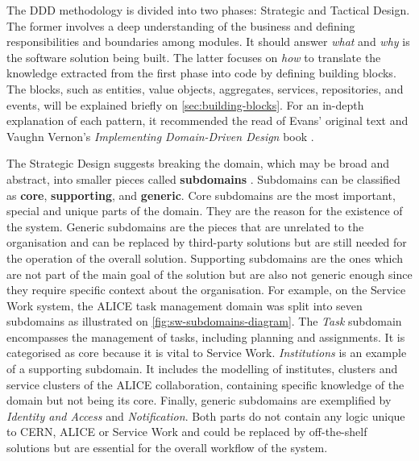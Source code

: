 The DDD methodology is divided into two phases: Strategic and Tactical Design. The former involves a deep understanding of the business and defining responsibilities and boundaries among modules. It should answer \textit{what} and \textit{why} is the software solution being built. The latter focuses on \textit{how} to translate the knowledge extracted from the first phase into code by defining building blocks. The blocks, such as entities, value objects, aggregates, services, repositories, and events, will be explained briefly on \autoref{sec:building-blocks}. For an in-depth explanation of each pattern, it recommended the read of Evans' original text \cite{ddd-blue-book} and Vaughn Vernon's \textit{Implementing Domain-Driven Design} book \cite{ddd-red-book}.

The Strategic Design suggests breaking the domain, which may be broad and abstract, into smaller pieces called \textbf{subdomains} \cite{petter-holmstrom-part1}. Subdomains can be classified as \textbf{core}, \textbf{supporting}, and \textbf{generic}. Core subdomains are the most important, special and unique parts of the domain. They are the reason for the existence of the system. Generic subdomains are the pieces that are unrelated to the organisation and can be replaced by third-party solutions but are still needed for the operation of the overall solution. Supporting subdomains are the ones which are not part of the main goal of the solution but are also not generic enough since they require specific context about the organisation. For example, on the Service Work system, the ALICE task management domain was split into seven subdomains as illustrated on \autoref{fig:sw-subdomains-diagram}. The \textit{Task} subdomain encompasses the management of tasks, including planning and assignments. It is categorised as core because it is vital to Service Work. \textit{Institutions} is an example of a supporting subdomain. It includes the modelling of institutes, clusters and service clusters of the ALICE collaboration, containing specific knowledge of the domain but not being its core. Finally, generic subdomains are exemplified by \textit{Identity and Access} and \textit{Notification}. Both parts do not contain any logic unique to CERN, ALICE or Service Work and could be replaced by off-the-shelf solutions but are essential for the overall workflow of the system.

